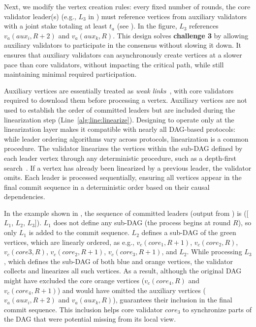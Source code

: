 Next, we modify the vertex creation rules: every fixed number of rounds, the core validator leader(s) (e.g., $L_3$ in ) must reference vertices from auxiliary validators with a joint stake totaling at least $t_a$ (see ). In the figure, $L_3$ references $v_a(aux_i, R+2)$ and $v_a(aux_k, R)$.
%
This design solves \textbf{challenge 3} by allowing auxiliary validators to participate in the consensus without slowing it down. It ensures that auxiliary validators can asynchronously create vertices at a slower pace than core validators, without impacting the critical path, while still maintaining minimal required participation.

Auxiliary vertices are essentially treated as \emph{weak links}~\cite{dag-rider}, with core validators required to download them before processing a vertex. Auxiliary vertices are not used to establish the order of committed leaders but are included during the linearization step (Line~\ref{alg:line:linearize}). Designing \sysname to operate only at the linearization layer makes it compatible with nearly all DAG-based protocols: while leader ordering algorithms vary across protocols, linearization is a common procedure. The validator linearizes the vertices within the sub-DAG defined by each leader vertex through any deterministic procedure, such as a depth-first search~\cite{dag-rider}. If a vertex has already been linearized by a previous leader, the validator omits. Each leader is processed sequentially, ensuring all vertices appear in the final commit sequence in a deterministic order based on their causal dependencies.

In the example shown in , the sequence of committed leaders (output from ) is ([$L_1$, $L_2$, $L_3$]).
$L_{1}$ does not define any sub-DAG (the process begins at round $R$), so only $L_1$ is added to the commit sequence.
$L_{2}$ defines a sub-DAG of the green vertices, which are linearly ordered, as e.g., $v_c(core_1,R+1)$, $v_c(core_2,R)$, $v_c(core3,R)$, $v_c(core_2,R+1)$, $v_c(core_3,R+1)$, and $L_2$.
While processing $L_3$, which defines the sub-DAG of both blue and orange vertices, the validator collects and linearizes all such vertices. As a result, although the original DAG might have excluded the core orange vertices ($v_c(core_4, R)$ and $v_c(core_4, R+1)$) and would have omitted the auxiliary vertices ($v_a(aux_i,R+2)$ and $v_a(aux_k,R)$), \sysname guarantees their inclusion in the final commit sequence. This inclusion helps core validator $core_3$ to synchronize parts of the DAG that were potential missing from its local view.

